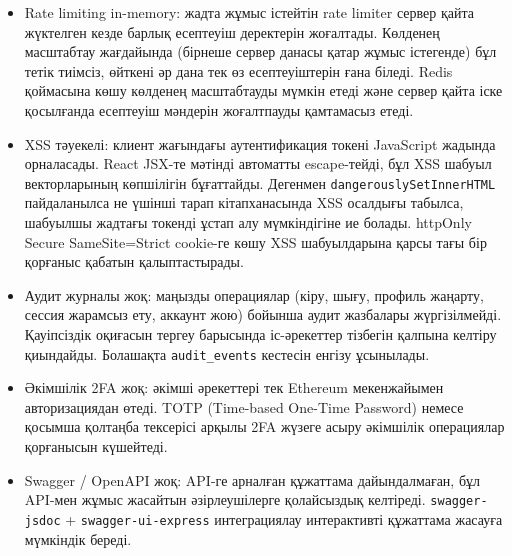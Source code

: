 \documentclass[14pt,a4paper]{extarticle}
\begin{document}
\begin{itemize}[nosep]
\item Rate limiting in-memory: жадта жұмыс істейтін rate limiter сервер қайта жүктелген кезде барлық есептеуіш деректерін жоғалтады. Көлденең масштабтау жағдайында (бірнеше сервер данасы қатар жұмыс істегенде) бұл тетік тиімсіз, өйткені әр дана тек өз есептеуіштерін ғана біледі. Redis қоймасына көшу көлденең масштабтауды мүмкін етеді және сервер қайта іске қосылғанда есептеуіш мәндерін жоғалтпауды қамтамасыз етеді.
\item XSS тәуекелі: клиент жағындағы аутентификация токені JavaScript жадында орналасады. React JSX-те мәтінді автоматты escape-тейді, бұл XSS шабуыл векторларының көпшілігін бұғаттайды. Дегенмен \texttt{dangerouslySetInnerHTML} пайдаланылса не үшінші тарап кітапханасында XSS осалдығы табылса, шабуылшы жадтағы токенді ұстап алу мүмкіндігіне ие болады. httpOnly Secure SameSite=Strict cookie-ге көшу XSS шабуылдарына қарсы тағы бір қорғаныс қабатын қалыптастырады.
\item Аудит журналы жоқ: маңызды операциялар (кіру, шығу, профиль жаңарту, сессия жарамсыз ету, аккаунт жою) бойынша аудит жазбалары жүргізілмейді. Қауіпсіздік оқиғасын тергеу барысында іс-әрекеттер тізбегін қалпына келтіру қиындайды. Болашақта \texttt{audit\_events} кестесін енгізу ұсынылады.
\item Әкімшілік 2FA жоқ: әкімші әрекеттері тек Ethereum мекенжайымен авторизациядан өтеді. TOTP (Time-based One-Time Password) немесе қосымша қолтаңба тексерісі арқылы 2FA жүзеге асыру әкімшілік операциялар қорғанысын күшейтеді.
\item Swagger / OpenAPI жоқ: API-ге арналған құжаттама дайындалмаған, бұл API-мен жұмыс жасайтын әзірлеушілерге қолайсыздық келтіреді. \texttt{swagger-jsdoc} + \texttt{swagger-ui-express} интеграциялау интерактивті құжаттама жасауға мүмкіндік береді.
\end{itemize}
\end{document}
